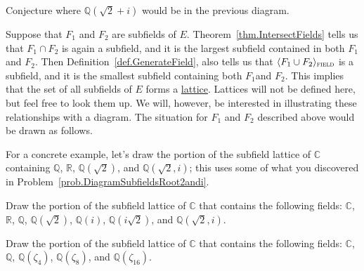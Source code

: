 \begin{problem}
Conjecture where $\mathbb{Q}\left(\sqrt{2}+i\right)$ would be in the previous diagram.
\end{problem}

Suppose that $F_1$ and $F_2$ are subfields of $E$. Theorem~\ref{thm.IntersectFields} tells us that $F_1\cap F_2$ is again a subfield, and it is the largest subfield contained in both $F_1$ and $F_2$. Then Definition~\ref{def.GenerateField}, also tells us that $\langle F_1\cup F_2 \rangle_{\textsc{field}}$ is a subfield, and it is the smallest subfield containing both $F_1$and $F_2$. This implies that the set of all subfields of $E$ forms a \href{https://en.wikipedia.org/wiki/Lattice_(order)}{lattice}. Lattices will not be defined here, but feel free to look them up. We will, however, be interested in illustrating these relationships with a diagram. The situation for $F_1$ and $F_2$ described above would be drawn as follows.
\begin{center}
\end{center}

For a concrete example, let's draw the portion of the subfield lattice of $\mathbb{C}$ containing $\mathbb{Q}$, $\mathbb{R}$, $\mathbb{Q}(\sqrt{2})$, and $\mathbb{Q}\left(\sqrt{2},i\right)$; this uses some of what you discovered in Problem~\ref{prob.DiagramSubfieldsRoot2andi}.

\begin{center}
\end{center}

\begin{problem}\label{prob.LatticeSubfieldsRoot2andi}
Draw the portion of the subfield lattice of $\mathbb{C}$ that contains the following fields:
$\mathbb{C}$, $\mathbb{R}$, $\mathbb{Q}$, $\mathbb{Q}\left(\sqrt{2}\right)$, $\mathbb{Q}(i)$, $\mathbb{Q}\left(i\sqrt{2}\right)$, and $\mathbb{Q}\left(\sqrt{2},i\right)$.
\end{problem}

\begin{problem}
Draw the portion of the subfield lattice of $\mathbb{C}$ that contains the following fields:
$\mathbb{C}$, $\mathbb{Q}$, $\mathbb{Q}(\zeta_4)$, $\mathbb{Q}(\zeta_8)$, and $\mathbb{Q}(\zeta_{16})$.
\end{problem}

